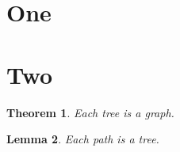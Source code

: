 \documentclass[10pt]{article}
\numberwithin{equation}{section}
\newtheorem{theorem}{Theorem}[section]
\newtheorem{lemma}[theorem]{Lemma}
\begin{document}
\section{One}
\section{Two}
\begin{theorem} Each tree is a graph. \end{theorem}
\begin{lemma} Each path is a tree. \end{lemma}
\end{document}
